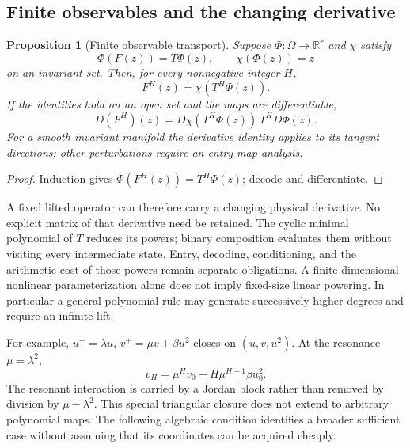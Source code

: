 \documentclass[journal]{IEEEtran}
\newtheorem{proposition}[theorem]{Proposition}
\theoremstyle{definition}
\newcommand{\R}{\mathbb{R}}
\begin{document}
\subsection{Finite observables and the changing derivative}
\begin{proposition}[Finite observable transport]\label{prop:observable}
Suppose $\Phi:\Omega\to\R^r$ and $\chi$ satisfy
\[
 \Phi(F(z))=T\Phi(z),\qquad \chi(\Phi(z))=z
\]
on an invariant set. Then, for every nonnegative integer $H$,
\begin{equation}
 F^H(z)=\chi(T^H\Phi(z)). \label{eq:observable-power}
\end{equation}
If the identities hold on an open set and the maps are differentiable,
\begin{equation}
 D(F^H)(z)=D\chi(T^H\Phi(z))\,T^H D\Phi(z).
\end{equation}
For a smooth invariant manifold the derivative identity applies to its
tangent directions; other perturbations require an entry-map analysis.
\end{proposition}
\begin{proof}
Induction gives $\Phi(F^H(z))=T^H\Phi(z)$; decode and differentiate.
\end{proof}
A fixed lifted operator can therefore carry a changing physical derivative.
No explicit matrix of that derivative need be retained. The cyclic minimal
polynomial of $T$ reduces its powers; binary composition evaluates them
without visiting every intermediate state. Entry, decoding, conditioning,
and the arithmetic cost of those powers remain separate obligations.
A finite-dimensional nonlinear parameterization alone does not imply
fixed-size linear powering. In particular a general polynomial rule may
generate successively higher degrees and require an infinite lift.

For example, $u^+=\lambda u$, $v^+=\mu v+\beta u^2$ closes on
$(u,v,u^2)$. At the resonance $\mu=\lambda^2$,
\[
 v_H=\mu^H v_0+H\mu^{H-1}\beta u_0^2.
\]
The resonant interaction is carried by a Jordan block rather than removed
by division by $\mu-\lambda^2$. This special triangular closure does not
extend to arbitrary polynomial maps. The following algebraic condition
identifies a broader sufficient case without assuming that its coordinates
can be acquired cheaply.
\end{document}

